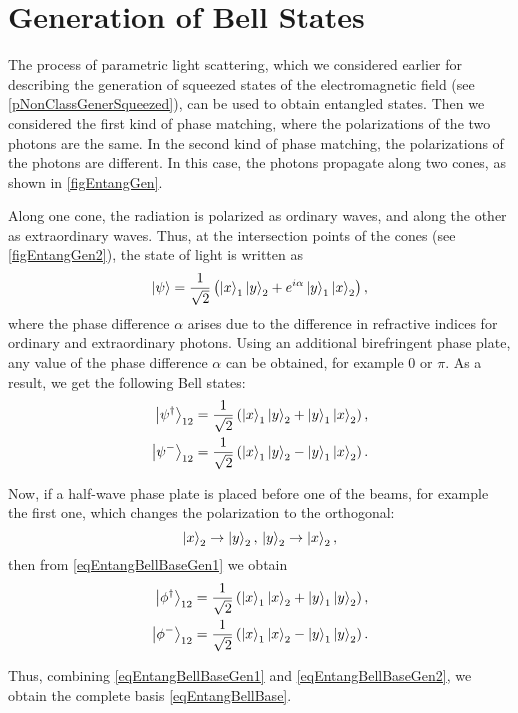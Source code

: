 \section{Generation of Bell States}
\label{subsecPart3NonclassEntanglBelGener}

The process of parametric light scattering, which we considered earlier for describing the generation of squeezed states of the electromagnetic field (see \ref{pNonClassGenerSqueezed}), can be used to obtain entangled states. Then we considered the first kind of phase matching, where the polarizations of the two photons are the same. In the second kind of phase matching, the polarizations of the photons are different. In this case, the photons propagate along two cones, as shown in \autoref{figEntangGen}.



Along one cone, the radiation is polarized as ordinary waves, and along the other as extraordinary waves. Thus, at the intersection points of the cones (see \autoref{figEntangGen2}), the state of light is written as
\begin{equation}
\left|\psi\right> =
  \frac{1}{\sqrt{2}}\left(
  \ket{x}_1\ket{y}_2 + e^{i \alpha}
  \ket{y}_1\ket{x}_2
  \right),
\nonumber
\end{equation}
where the phase difference $\alpha$ arises due to the difference in refractive indices for ordinary and extraordinary photons. Using an additional birefringent phase plate, any value of the phase difference $\alpha$ can be obtained, for example $0$ or $\pi$. As a result, we get the following Bell states:
\begin{eqnarray}
  \left|\psi^{\dag}\right>_{12} = 
  \frac{1}{\sqrt{2}}\left(
  \ket{x}_1\ket{y}_2 + 
  \ket{y}_1\ket{x}_2
  \right),
  \nonumber \\
  \left|\psi^{-}\right>_{12} = 
  \frac{1}{\sqrt{2}}\left(
  \ket{x}_1\ket{y}_2 - 
  \ket{y}_1\ket{x}_2
  \right).
  \label{eqEntangBellBaseGen1}
\end{eqnarray}



Now, if a half-wave phase plate is placed before one of the beams, for example the first one, which changes the polarization to the orthogonal:
\begin{equation}
\ket{x}_2 \rightarrow \ket{y}_2, \, \ket{y}_2 \rightarrow \ket{x}_2,
\nonumber
\end{equation}
then from \eqref{eqEntangBellBaseGen1} we obtain
\begin{eqnarray}
  \left|\phi^{\dag}\right>_{12} = 
  \frac{1}{\sqrt{2}}\left(
  \ket{x}_1\ket{x}_2 + 
  \ket{y}_1\ket{y}_2
  \right),
  \nonumber \\
  \left|\phi^{-}\right>_{12} = 
  \frac{1}{\sqrt{2}}\left(
  \ket{x}_1\ket{x}_2 - 
  \ket{y}_1\ket{y}_2
  \right).
  \label{eqEntangBellBaseGen2}
\end{eqnarray}

Thus, combining \eqref{eqEntangBellBaseGen1} and \eqref{eqEntangBellBaseGen2}, we obtain the complete basis \eqref{eqEntangBellBase}.
